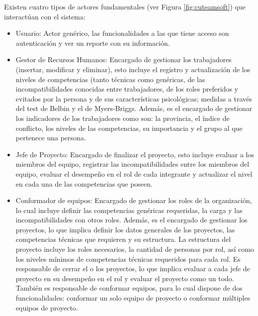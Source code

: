 Existen cuatro tipos de actores fundamentales (ver Figura \ref{fig:cuteamsoft}) que interactúan con el sistema:
\begin{itemize}
	\item Usuario: Actor genérico, las funcionalidades a las que tiene acceso son autenticación y ver un reporte con su información.
	
	\item Gestor de Recursos Humanos: Encargado de gestionar los trabajadores (insertar, modificar y eliminar), esto incluye el registro y actualización de los niveles de competencias (tanto técnicas como genéricas, de las incompatibilidades conocidas entre trabajadores, de los roles preferidos y evitados por la persona y de sus características psicológicas; medidas a través del test de Belbin y el de Myers-Briggs. Además, es el encargado de gestionar los indicadores de los trabajadores como son: la provincia, el índice de conflicto, los niveles de las competencias, su importancia y el grupo al que pertenece una persona.
	
	\item Jefe de Proyecto: Encargado de finalizar el proyecto, esto incluye evaluar a los miembros del equipo, registrar las incompatibilidades entre los miembros del equipo, evaluar el desempeño en el rol de cada integrante y actualizar el nivel en cada una de las competencias que poseen.
	
	\item Conformador de equipos: Encargado de gestionar los roles de la organización, lo cual incluye definir las competencias genéricas requeridas, la carga y las incompatibilidades con otros roles. Además, es el encargado de gestionar los proyectos, lo que implica definir los datos generales de los proyectos, las competencias técnicas que requieren y su estructura. La estructura del proyecto incluye los roles necesarios, la cantidad de personas por rol, así como los niveles mínimos de competencias técnicas requeridos para cada rol. Es responsable de cerrar el o los proyectos, lo que implica evaluar a cada jefe de proyecto en su desempeño en el rol y evaluar el proyecto como un todo. También es responsable de conformar equipos, para lo cual dispone de dos funcionalidades: conformar un solo equipo de proyecto o conformar múltiples equipos de proyecto.
\end{itemize}

